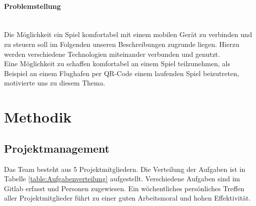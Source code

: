 \documentclass[a4paper]{spie}  %
\begin{document}
		\paragraph{Problemstellung}\mbox{}\\
Die Möglichkeit ein Spiel komfortabel mit einem mobilen Gerät zu verbinden und zu steuern soll im Folgenden unseren Beschreibungen zugrunde liegen. Hierzu werden verschiedene Technologien miteinander verbunden und genutzt.\\
Eine Möglichkeit zu schaffen komfortabel an einem Spiel teilzunehmen, als Beispiel an einem Flughafen per QR-Code einem laufenden Spiel beizutreten, motivierte uns zu diesem Thema.


\section{Methodik}
\subsection{Projektmanagement}
Das Team besteht aus 5 Projektmitgliedern. Die Verteilung der Aufgaben ist in Tabelle \ref{table:Aufgabenverteilung} aufgestellt.
Verschiedene Aufgaben sind im Gitlab erfasst und Personen zugewiesen. Ein wöchentliches persönliches Treffen aller Projektmitglieder führt zu einer guten Arbeitsmoral und hohen Effektivität.
\end{document}

